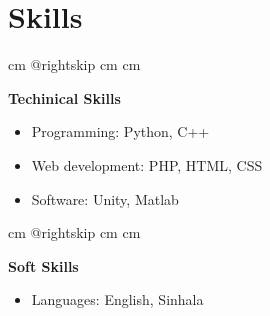 \documentclass[10pt, a4paper]{article}
\newenvironment{highlights}{
        \begin{itemize}[
                topsep=0pt,
                parsep=0.10 cm,
                partopsep=0pt,
                itemsep=0pt,
                after=\vspace{-1\baselineskip},
                leftmargin=0.4 cm + 3pt
            ]
    }{
        \end{itemize}
    } %
\let\hrefWithoutArrow\href
\renewcommand{\href}[2]{\hrefWithoutArrow{#1}{\mbox{\ifthenelse{\equal{#2}{}}{ }{#2 }\raisebox{.15ex}{\footnotesize \faExternalLink*}}}}
\let\originalTabularx\tabularx
\let\originalEndTabularx\endtabularx
\renewenvironment{tabularx}{\bgroup\centering\originalTabularx}{\originalEndTabularx\par\egroup}
\begin{document}
%
%
%
%
%

\vspace{0.2 cm}
 \section{Skills}

        \begingroup{} cm
        \advance\csname @rightskip cm
        \advance{} cm

        \textbf{Techinical Skills} 
        \begin{highlights}
        \item Programming: Python, C++
        \item Web development: PHP, HTML, CSS %
        \item Software: Unity, Matlab%
        \end{highlights}
        \par\endgroup

        \vspace{0.6 cm}
        \begingroup{} cm
        \advance\csname @rightskip cm
        \advance{} cm

        \textbf{Soft Skills}  \begin{highlights}
        \item Languages: English, Sinhala \end{highlights}
        \par\endgroup
    
    \vspace{0.4 cm}
    
\end{document}
